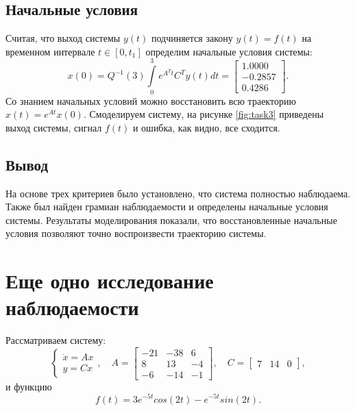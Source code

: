 \subsection{Начальные условия}

Считая, что выход системы $y(t)$ подчиняется закону $y(t) = f (t)$ на временном
интервале $t \in [0, t_1]$ определим начальные условия системы:
\begin{equation*}
    x(0)=Q^{-1}(3)\int\limits_{0}^{3}e^{A^Tt}C^Ty(t)dt
    =\begin{bmatrix}
        1.0000 \\ -0.2857 \\ 0.4286
    \end{bmatrix}.
\end{equation*}
Со знанием начальных условий можно восстановить всю траекторию
$x(t)=e^{At}x(0)$. Смоделируем систему, на рисунке \ref{fig:task3}
приведены выход системы, сигнал $f(t)$ и ошибка, как видно, все сходится.

\subsection{Вывод}

На основе трех критериев было установлено, 
что система полностью наблюдаема. Также был найден грамиан наблюдаемости и определены 
начальные условия системы. Результаты моделирования показали, что восстановленные 
начальные условия позволяют точно воспроизвести траекторию системы.



\section{Еще одно исследование наблюдаемости}

Рассматриваем систему:
\begin{equation*}
    \begin{cases}
        \dot x = Ax\\
        y = Cx
    \end{cases},\quad
    A = \begin{bmatrix}
        -21 & -38 & 6 \\
        8 & 13 & -4 \\
        -6 & -14 & -1
    \end{bmatrix},\quad
    C = \begin{bmatrix}
        7 & 14 & 0
    \end{bmatrix},
\end{equation*}
и функцию
\begin{equation*}
    f(t)=3e^{-5t} cos(2t) - e^{-5t} sin(2t).
\end{equation*}

